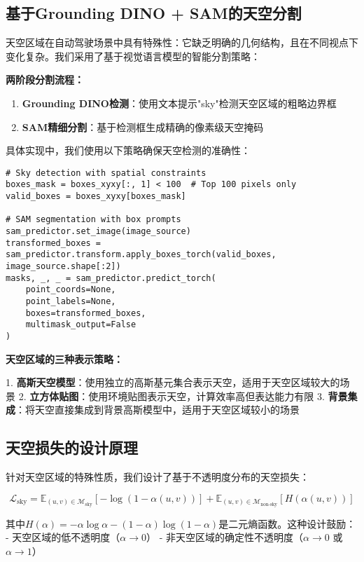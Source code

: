 \subsection{基于Grounding DINO + SAM的天空分割}

天空区域在自动驾驶场景中具有特殊性：它缺乏明确的几何结构，且在不同视点下变化复杂。我们采用了基于视觉语言模型的智能分割策略：

\textbf{两阶段分割流程：}
\begin{enumerate}
\item \textbf{Grounding DINO检测}：使用文本提示"sky"检测天空区域的粗略边界框
\item \textbf{SAM精细分割}：基于检测框生成精确的像素级天空掩码
\end{enumerate}

具体实现中，我们使用以下策略确保天空检测的准确性：

\begin{verbatim}
# Sky detection with spatial constraints
boxes_mask = boxes_xyxy[:, 1] < 100  # Top 100 pixels only
valid_boxes = boxes_xyxy[boxes_mask]

# SAM segmentation with box prompts
sam_predictor.set_image(image_source)
transformed_boxes = sam_predictor.transform.apply_boxes_torch(valid_boxes, image_source.shape[:2])
masks, _, _ = sam_predictor.predict_torch(
    point_coords=None,
    point_labels=None, 
    boxes=transformed_boxes,
    multimask_output=False
)
\end{verbatim}

\textbf{天空区域的三种表示策略：}

1. \textbf{高斯天空模型}：使用独立的高斯基元集合表示天空，适用于天空区域较大的场景
2. \textbf{立方体贴图}：使用环境贴图表示天空，计算效率高但表达能力有限
3. \textbf{背景集成}：将天空直接集成到背景高斯模型中，适用于天空区域较小的场景

\subsection{天空损失的设计原理}

针对天空区域的特殊性质，我们设计了基于不透明度分布的天空损失：

\begin{equation}
\mathcal{L}_{\text{sky}} = \mathbb{E}_{(u,v) \in \mathcal{M}_{\text{sky}}} [-\log(1-\alpha(u,v))] + \mathbb{E}_{(u,v) \in \mathcal{M}_{\text{non-sky}}} [H(\alpha(u,v))]
\label{eq:sky_loss_design}
\end{equation}

其中$H(\alpha) = -\alpha \log \alpha - (1-\alpha) \log(1-\alpha)$是二元熵函数。这种设计鼓励：
- 天空区域的低不透明度（$\alpha \rightarrow 0$）
- 非天空区域的确定性不透明度（$\alpha \rightarrow 0$ 或 $\alpha \rightarrow 1$）


